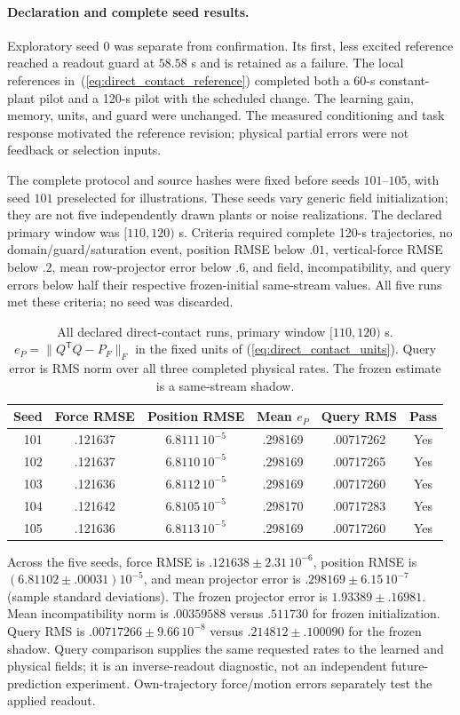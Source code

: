 \documentclass[journal]{IEEEtran}
\begin{document}
\paragraph{Declaration and complete seed results.}
Exploratory seed $0$ was separate from confirmation. Its first, less excited
reference reached a readout guard at $58.58$ s and is retained as a failure.
The local references in~(\ref{eq:direct_contact_reference}) completed both a
60-s constant-plant pilot and a 120-s pilot with the scheduled change.
The learning gain, memory, units, and guard were unchanged. The measured
conditioning and task response motivated the reference revision; physical
partial errors were not feedback or selection inputs.

The complete protocol and source hashes were fixed before seeds
$101$--$105$, with seed $101$ preselected for illustrations. These seeds vary
generic field initialization; they are not five independently drawn plants or
noise realizations. The declared primary window was $[110,120)$ s. Criteria
required complete 120-s trajectories, no domain/guard/saturation event,
position RMSE below $.01$, vertical-force RMSE below $.2$, mean row-projector
error below $.6$, and field, incompatibility, and query errors below half their
respective frozen-initial same-stream values. All five runs met these
criteria; no seed was discarded.

\begin{table}[t]
\centering\small\setlength{\tabcolsep}{2.5pt}
\caption{All declared direct-contact runs, primary window $[110,120)$ s.
$e_P=\|Q^{\mathsf T}Q-P_F\|_F$ in the fixed units of
(\ref{eq:direct_contact_units}). Query error is RMS norm over all three
completed physical rates. The frozen estimate is a same-stream shadow.}
\label{tab:direct_contact_seeds}
\begin{tabular}{rccccc}
\hline
Seed & Force RMSE & Position RMSE & Mean $e_P$ & Query RMS & Pass\\
\hline
101 & .121637 & $6.8111\,10^{-5}$ & .298169 & .00717262 & Yes\\
102 & .121637 & $6.8110\,10^{-5}$ & .298169 & .00717265 & Yes\\
103 & .121636 & $6.8112\,10^{-5}$ & .298169 & .00717260 & Yes\\
104 & .121642 & $6.8105\,10^{-5}$ & .298170 & .00717283 & Yes\\
105 & .121636 & $6.8113\,10^{-5}$ & .298169 & .00717260 & Yes\\
\hline
\end{tabular}
\end{table}
Across the five seeds, force RMSE is $.121638\pm2.31\,10^{-6}$,
position RMSE is $(6.81102\pm.00031)10^{-5}$, and mean projector error is
$.298169\pm6.15\,10^{-7}$ (sample standard deviations). The frozen projector
error is $1.93389\pm.16981$. Mean incompatibility norm is $.00359588$ versus
$.511730$ for frozen initialization. Query RMS is $.00717266\pm9.66\,10^{-8}$
versus $.214812\pm.100090$ for the frozen shadow. Query comparison supplies
the same requested rates to the learned and physical fields; it is an
inverse-readout diagnostic, not an independent future-prediction experiment.
Own-trajectory force/motion errors separately test the applied readout.
\end{document}
